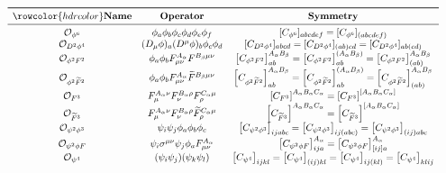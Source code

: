 \begin{table}[tbp]
\renewcommand{\arraystretch}{2.3}
\begin{align*}
\resizebox{\textwidth}{!}{
\begin{array}[t]{cccc}
\toprule
\rowcolor{hdrcolor}
\text{\textbf{Name}} & \text{\textbf{Operator}} &  \text{\textbf{Symmetry}} \\
\midrule
\mathcal O_{\phi^6} & \phi_a\phi_b\phi_c\phi_d\phi_e\phi_f & [C_{\phi^6}]_{abcdef}=[C_{\phi^6}]_{(abcdef)} \\
\mathcal O_{D^2\phi^4}  & (D_\mu \phi)_{a}(D^\mu \phi)_{b}\phi_{c}\phi_{d} & [C_{D^2\phi^4}]_{abcd} = [C_{D^2\phi^4}]_{(ab)cd} = [C_{D^2\phi^4}]_{ab(cd)}
\\
\mathcal{O}_{\phi^2 F^2} & \phi_{a}\phi_{b}F^{A_\alpha}_{\mu\nu}F^{B_\beta  \mu\nu} & \left[C_{\phi^2F^2}\right]^{A_\alpha B_\beta}_{ab}=\left[C_{\phi^2F^2}\right]^{(A_\alpha B_\beta)}_{ab}=\left[C_{\phi^2F^2}\right]^{A_\alpha B_\beta}_{(ab)} \\
\mathcal{O}_{\phi^2\tildee F^2} & \phi_{a}\phi_{b}F^{A_\alpha}_{\mu\nu}\tildee F^{B_\beta  \mu\nu} & \left[C_{\phi^2 \tildee F^2}\right]^{A_\alpha B_\beta}_{ab}=\left[C_{\phi^2\tildee F^2}\right]^{(A_\alpha B_\beta)}_{ab}=\left[C_{\phi^2\tildee F^2}\right]^{A_\alpha B_\beta}_{(ab)}\\
 \mathcal{O}_{F^3} & F^{A_\alpha\nu}_{\mu}F^{B_\alpha\rho}_{ \nu}F^{C_\alpha\mu}_{\rho} & \left[C_{F^3}\right]^{A_\alpha B_\alpha C_\alpha}=\left[C_{F^3}\right]^{[A_\alpha B_\alpha C_\alpha]}\\
  \mathcal{O}_{\tildee F^3} & F^{A_\alpha\nu}_{\mu}F^{B_\alpha\rho}_{ \nu}{\tildee F}^{C_\alpha\mu}_{\rho} & \left[C_{\tildee F^3}\right]^{A_\alpha B_\alpha C_\alpha}=\left[C_{\tildee F^3}\right]^{[A_\alpha B_\alpha C_\alpha]}\\
\mathcal O_{\psi^2\phi^3} &  \psi_i \psi_j \phi_a \phi_b \phi_c & \left[C_{\psi^2\phi^3}\right]_{ijabc} = \left[C_{\psi^2\phi^3}\right]_{ij(abc)} = \left[C_{\psi^2\phi^3}\right]_{(ij)abc} \\
\mathcal O_{\psi^2 \phi F}  & \psi_i \sigma^{\mu\nu} \psi_j \phi_a F_{\mu\nu}^{A_\alpha} & \left[C_{\psi^2 \phi F}\right]_{ija}^{A_\alpha} = \left[C_{\psi^2 \phi F}\right]_{[ij]a}^{A_\alpha}
\\
\mathcal{O}_{\psi^4} & (\psi_i \psi_j)(\psi_k\psi_l) & \left[C_{\psi^4}\right]_{ijkl} = \left[C_{\psi^4}\right]_{(ij)kl} = \left[C_{\psi^4}\right]_{ij(kl)} = \left[C_{\psi^4}\right]_{klij}  \\

\end{array}}
\end{align*}
\end{table}
